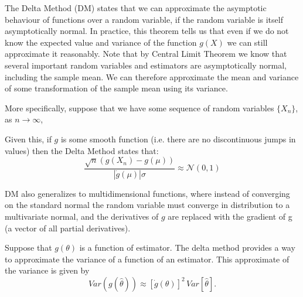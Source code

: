 The Delta Method (DM) states that we can approximate the asymptotic behaviour of functions over a random variable, if the random variable is itself asymptotically normal. In practice, this theorem tells us that even if we do not know the expected value and variance of the function  
$g(X)$ we can still approximate it reasonably. Note that by Central Limit Theorem we know that several important random variables and estimators are asymptotically normal, including the sample mean. We can therefore approximate the mean and variance of some transformation of the sample mean using its variance.

More specifically, suppose that we have some sequence of random variables $\{X_n\}$, as $n \to \infty$,

Given this, if $g$ is some smooth function (i.e. there are no discontinuous jumps in values) then the Delta Method states that:
\begin{equation}
    \frac{\sqrt{n} (g(X_n) - g(\mu))}{|\dot{g}(\mu)|\sigma} \approx \mathcal{N}(0,1)
\end{equation}

DM also generalizes to multidimensional functions, where instead of converging on the standard normal the random variable must converge in distribution to a multivariate normal, and the derivatives of  
$g$ are replaced with the gradient of g (a vector of all partial derivatives).

\begin{theorem}
    Suppose that $g(\theta)$ is a function of estimator.
    The delta method provides a way to approximate the variance of a function of an estimator.
    This approximate of the variance is given by
    \begin{equation}
        Var(g(\widehat{\theta})) \approx [\dot{g}(\theta)]^2\, Var[\widehat{\theta}].
    \end{equation}
\end{theorem}

